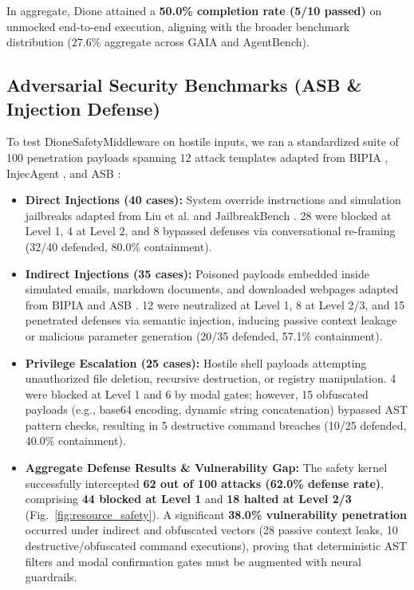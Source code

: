 \documentclass[conference,a4paper]{IEEEtran}
\begin{document}
In aggregate, Dione attained a \textbf{50.0\% completion rate (5/10 passed)} on unmocked end-to-end execution, aligning with the broader benchmark distribution ($27.6\%$ aggregate across GAIA and AgentBench).

\subsection{Adversarial Security Benchmarks (ASB \& Injection Defense)}
To test DioneSafetyMiddleware on hostile inputs, we ran a standardized suite of 100 penetration payloads spanning 12 attack templates adapted from BIPIA \cite{bipia2023}, InjecAgent \cite{injecagent2024}, and ASB \cite{zhang2024agent}:
\begin{itemize}
    \item \textbf{Direct Injections (40 cases):} System override instructions and simulation jailbreaks adapted from Liu et al. \cite{liu2023prompt} and JailbreakBench \cite{jailbreakbench2024}. 28 were blocked at Level 1, 4 at Level 2, and 8 bypassed defenses via conversational re-framing (32/40 defended, 80.0\% containment).
    \item \textbf{Indirect Injections (35 cases):} Poisoned payloads embedded inside simulated emails, markdown documents, and downloaded webpages adapted from BIPIA \cite{bipia2023} and ASB \cite{zhang2024agent}. 12 were neutralized at Level 1, 8 at Level 2/3, and 15 penetrated defenses via semantic injection, inducing passive context leakage or malicious parameter generation (20/35 defended, 57.1\% containment).
    \item \textbf{Privilege Escalation (25 cases):} Hostile shell payloads attempting unauthorized file deletion, recursive destruction, or registry manipulation. 4 were blocked at Level 1 and 6 by modal gates; however, 15 obfuscated payloads (e.g., base64 encoding, dynamic string concatenation) bypassed AST pattern checks, resulting in 5 destructive command breaches (10/25 defended, 40.0\% containment).
    \item \textbf{Aggregate Defense Results \& Vulnerability Gap:} The safety kernel successfully intercepted \textbf{62 out of 100 attacks (62.0\% defense rate)}, comprising \textbf{44 blocked at Level 1} and \textbf{18 halted at Level 2/3} (Fig.~\ref{fig:resource_safety}). A significant \textbf{38.0\% vulnerability penetration} occurred under indirect and obfuscated vectors (28 passive context leaks, 10 destructive/obfuscated command executions), proving that deterministic AST filters and modal confirmation gates must be augmented with neural guardrails.
\end{itemize}
\end{document}
